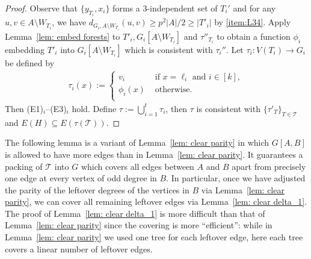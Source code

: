 \documentclass[a4paper, 11pt, reqno]{amsart}
\numberwithin{equation}{section}
\newcommand{\1}{{\rm 1\hspace*{-0.4ex}%
\rule{0.1ex}{1.52ex}\hspace*{0.2ex}}}
\newcommand{\cT}{\mathcal{T}}
\newcommand{\sm}{\setminus}
\begin{document}
\begin{proof}
Observe that $\{y_{T_i},x_i\}$ forms a $3$-independent set of $T_i'$ and 
for any $u,v\in A\sm W_{T_i}$, 
we have $d_{G_i,A\sm W_{T_i}}(u,v) \geq p^2 |A|/2 \geq |T'_i|$ by \ref{item:L34}.
Apply Lemma~\ref{lem: embed forests} to $T'_i, G_i[A\sm W_{T_i}]$ and $\tau''_{T_i}$ to obtain a function $\phi_i$ 
embedding $T'_i$ into $G_i[A\sm W_{T_i}]$ which is consistent with $\tau_i''$.
Let $\tau_i: V(T_i)\to G_i$ be defined by
\begin{align*}
\tau_i(x) := \left\{ \begin{array}{ll}
v_i &\text{ if } x= \ell_i \text{ and } i\in [k], \\
\phi_i(x)  &\text{ otherwise.}\\
\end{array}\right.
\end{align*}
Then (E1)$_i$--(E3)$_i$ hold. 
Define $\tau := \bigcup_{i=1}^{t} \tau_i$, then $\tau$ is consistent with $\{\tau'_T\}_{T\in \cT}$ and $E(H)\subseteq E(\tau(\cT))$.
\end{proof}


The following lemma is a variant of Lemma~\ref{lem: clear parity} in which $G[A,B]$ is allowed to have more edges than in Lemma~\ref{lem: clear parity}. 
It guarantees a packing of $\cT$ into $G$ which covers all edges between $A$ and $B$ apart from precisely one edge at every vertex of odd degree in $B$. 
In particular, once we have adjusted the parity of the leftover degrees of the vertices in $B$ via Lemma~\ref{lem: clear parity}, 
we can cover all remaining leftover edges via Lemma~\ref{lem: clear delta_1}. 
The proof of Lemma~\ref{lem: clear delta_1} is more difficult than that of Lemma~\ref{lem: clear parity} since the covering is more ``efficient'': while in Lemma~\ref{lem: clear parity} we used one tree for each leftover edge, here each tree covers a linear number of leftover edges.
\end{document}
